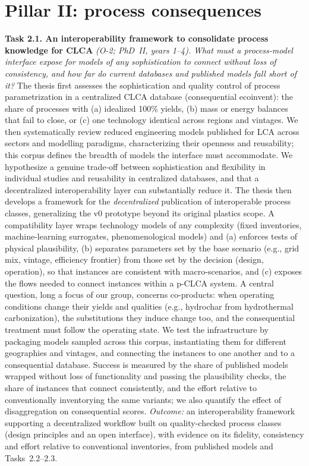 \documentclass[compact]{nserc} %
\begin{document}
\section{Pillar II: process consequences}

\noindent \textbf{Task 2.1. An interoperability framework to consolidate process knowledge for CLCA} \emph{(O-2; PhD~II, years 1--4).} \emph{What must a process-model interface expose for models of any sophistication to connect without loss of consistency, and how far do current databases and published models fall short of it?}
%
The thesis first assesses the sophistication and quality control of process parametrization in a centralized CLCA database (consequential ecoinvent): the share of processes with (a) idealized 100\% yields, (b) mass or energy balances that fail to close, or (c) one technology identical across regions and vintages. We then systematically review reduced engineering models published for LCA across sectors and modelling paradigms, characterizing their openness and reusability; this corpus defines the breadth of models the interface must accommodate. We hypothesize a genuine trade-off between sophistication and flexibility in individual studies and reusability in centralized databases, and that a decentralized interoperability layer can substantially reduce it. The thesis then develops a framework for the \emph{decentralized} publication of interoperable process classes, generalizing the v0 prototype beyond its original plastics scope. A compatibility layer wraps technology models of any complexity (fixed inventories, machine-learning surrogates, phenomenological models) and (a) enforces tests of physical plausibility, (b) separates parameters set by the base scenario (e.g., grid mix, vintage, efficiency frontier) from those set by the decision (design, operation), so that instances are consistent with macro-scenarios, and (c) exposes the flows needed to connect instances within a p-CLCA system. A central question, long a focus of our group, concerns co-products: when operating conditions change their yields and qualities (e.g., hydrochar from hydrothermal carbonization), the substitutions they induce change too, and the consequential treatment must follow the operating state. We test the infrastructure by packaging models sampled across this corpus, instantiating them for different geographies and vintages, and connecting the instances to one another and to a consequential database. Success is measured by the share of published models wrapped without loss of functionality and passing the plausibility checks, the share of instances that connect consistently, and the effort relative to conventionally inventorying the same variants; we also quantify the effect of disaggregation on consequential scores. \emph{Outcome:} an interoperability framework supporting a decentralized workflow built on quality-checked process classes (design principles and an open interface), with evidence on its fidelity, consistency and effort relative to conventional inventories, from published models and Tasks~2.2--2.3.
\end{document}
